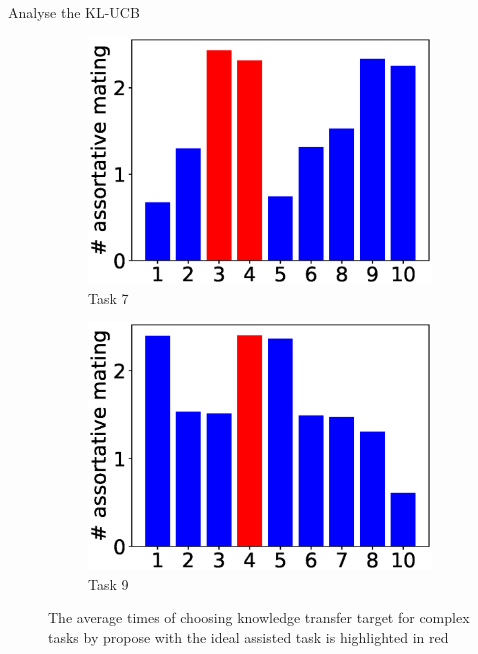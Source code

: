 \begin{frame}{Analyse the KL-UCB}
\begin{figure}
\begin{subfigure}[b]{0.3\linewidth}
            \centering
            \includegraphics[width=\linewidth]{figure/experiment/bar10/7.eps}
            \caption{Task 7}
            \label{fig:bar10-7}
        \end{subfigure}
        \hfill
        \begin{subfigure}[b]{0.3\linewidth}
            \centering
            \includegraphics[width=\linewidth]{figure/experiment/bar10/9.eps}
            \caption{Task 9}
            \label{fig:bar10-9}
        \end{subfigure}
        \hfill
        \caption{The average times of choosing knowledge transfer target for complex tasks by \gls{propose} with the ideal assisted task is highlighted in red}
        \label{fig:count10}
    \end{figure}
\end{frame}


